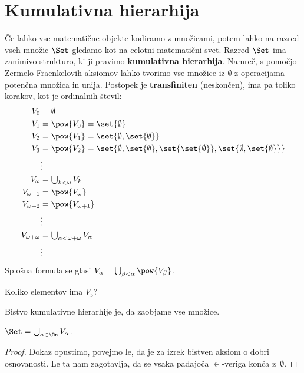 \section{Kumulativna hierarhija}

Če lahko vse matematične objekte kodiramo z množicami, potem lahko na razred
vseh množic $\Set$ gledamo kot na celotni matematični svet. Razred $\Set$ ima
zanimivo strukturo, ki ji pravimo \textbf{kumulativna hierarhija}. Namreč, s pomočjo
Zermelo-Fraenkelovih aksiomov lahko tvorimo vse množice iz $\emptyset$ z
operacijama potenčna množica in unija. Postopek je \textbf{transfiniten} (neskončen), ima pa toliko korakov, kot je ordinalnih števil:
%
\begin{align*}
  V_0 &= \emptyset \\
  V_1 &= \pow{V_0} = \set{\emptyset} \\
  V_2 &= \pow{V_1} = \set{\emptyset, \set{\emptyset}} \\
  V_3 &= \pow{V_2} = \set{\emptyset, \set{\emptyset}, \set{\set{\emptyset}}, \set{\emptyset, \set{\emptyset}}} \\
      &\vdots \\
  V_\omega &= \textstyle\bigcup_{k < \omega} V_k \\
  V_{\omega+1} &= \pow{V_\omega} \\
  V_{\omega+2} &= \pow{V_{\omega+1}} \\
  &\vdots \\
  V_{\omega + \omega} &= \textstyle\bigcup_{\alpha < \omega + \omega} V_\alpha \\
  &\vdots
\end{align*}
%
Splošna formula se glasi $V_\alpha = \textstyle\bigcup_{\beta < \alpha} \pow{V_\beta}$.


\begin{vaja}
  Koliko elementov ima $V_5$?
\end{vaja}

Bistvo kumulativne hierarhije je, da zaobjame vse množice.

\begin{izrek}
  $\Set = \bigcup_{\alpha \in \On} V_\alpha$.
\end{izrek}

\begin{proof}
  Dokaz opustimo, povejmo le, da je za izrek bistven aksiom o dobri osnovanosti. Le ta nam zagotavlja, da se vsaka padajoča $\in$-veriga konča z~$\emptyset$.
\end{proof}


